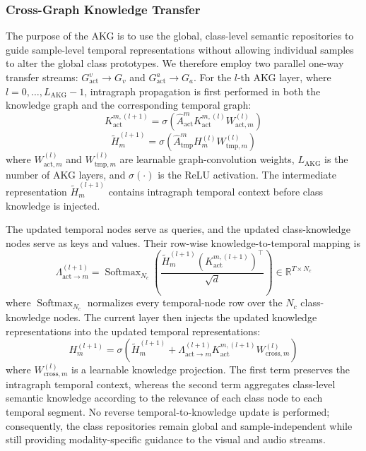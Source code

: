 \documentclass[lettersize,journal]{IEEEtran}
\begin{document}
\subsubsection{Cross-Graph Knowledge Transfer}
The purpose of the AKG is to use the global, class-level semantic repositories to guide sample-level temporal representations without allowing individual samples to alter the global class prototypes. We therefore employ two parallel one-way transfer streams: $G_{\mathrm{act}}^v\rightarrow G_v$ and $G_{\mathrm{act}}^a\rightarrow G_a$. For the $l$-th AKG layer, where $l=0,\ldots,L_{\mathrm{AKG}}-1$, intragraph propagation is first performed in both the knowledge graph and the corresponding temporal graph:
\begin{equation}
K_{\mathrm{act}}^{m,(l+1)}=
\sigma\left(
\widehat A_{\mathrm{act}}^mK_{\mathrm{act}}^{m,(l)}W_{\mathrm{act},m}^{(l)}
\right)
\end{equation}
\begin{equation}
\widetilde H_m^{(l+1)}=
\sigma\left(
\widehat A_{\mathrm{tmp}}^mH_m^{(l)}W_{\mathrm{tmp},m}^{(l)}
\right)
\end{equation}
where $W_{\mathrm{act},m}^{(l)}$ and $W_{\mathrm{tmp},m}^{(l)}$ are learnable graph-convolution weights, $L_{\mathrm{AKG}}$ is the number of AKG layers, and $\sigma(\cdot)$ is the ReLU activation. The intermediate representation $\widetilde H_m^{(l+1)}$ contains intragraph temporal context before class knowledge is injected.

The updated temporal nodes serve as queries, and the updated class-knowledge nodes serve as keys and values. Their row-wise knowledge-to-temporal mapping is
\begin{equation}
\Lambda_{\mathrm{act}\rightarrow m}^{(l+1)}=
\operatorname{Softmax}_{N_c}\left(
\frac{\widetilde H_m^{(l+1)}\left(K_{\mathrm{act}}^{m,(l+1)}\right)^{\top}}{\sqrt{d}}
\right)
\in\mathbb{R}^{T\times N_c}
\end{equation}
where $\operatorname{Softmax}_{N_c}$ normalizes every temporal-node row over the $N_c$ class-knowledge nodes. The current layer then injects the updated knowledge representations into the updated temporal representations:
\begin{equation}
H_m^{(l+1)}=
\sigma\left(
\widetilde H_m^{(l+1)}+
\Lambda_{\mathrm{act}\rightarrow m}^{(l+1)}
K_{\mathrm{act}}^{m,(l+1)}W_{\mathrm{cross},m}^{(l)}
\right)
\end{equation}
where $W_{\mathrm{cross},m}^{(l)}$ is a learnable knowledge projection. The first term preserves the intragraph temporal context, whereas the second term aggregates class-level semantic knowledge according to the relevance of each class node to each temporal segment. No reverse temporal-to-knowledge update is performed; consequently, the class repositories remain global and sample-independent while still providing modality-specific guidance to the visual and audio streams.
\end{document}

